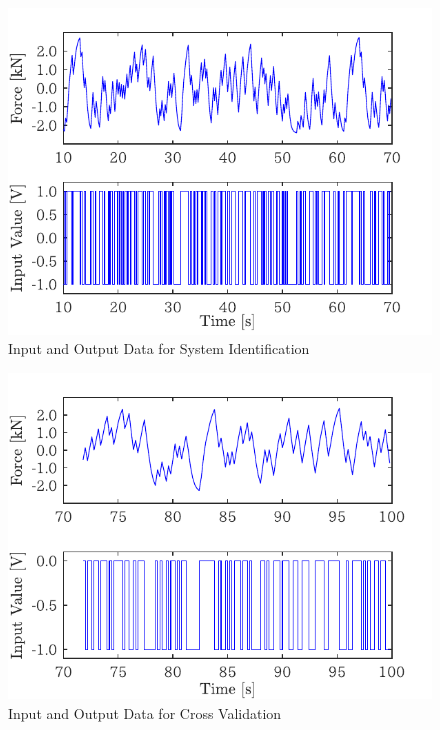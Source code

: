 \begin{figure}[t]
    \centering
        \includegraphics[keepaspectratio, scale=1.0]{contents/SystemIdentification/figure/1018Mseq_inputToFmea_10-70.pdf}
        \caption{Input and Output Data for System Identification}
        \label{fig:1018Mseq_inputToFmea_10-70}
\end{figure}
\begin{figure}[t]
    \centering
        \includegraphics[keepaspectratio, scale=1.0]{contents/SystemIdentification/figure/1018Mseq_inputToFmea_72-100.pdf}
        \caption{Input and Output Data for Cross Validation}
        \label{fig:1018Mseq_inputToFmea_72-100}
\end{figure}

